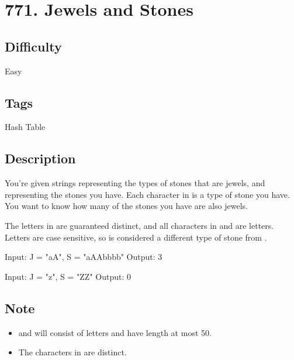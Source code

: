 \tocless\section{771. Jewels and Stones}
\label{algo:771}

\subsection*{Difficulty}
Easy

\subsection*{Tags}
Hash Table

\subsection*{Description}
You're given strings  representing the types of stones that are jewels, and  representing the stones you have. Each character in  is a type of stone you have. You want to know how many of the stones you have are also jewels.

The letters in  are guaranteed distinct, and all characters in  and  are letters. Letters are case sensitive, so  is considered a different type of stone from .

\begin{example}
\begin{multilinecode}
Input: J = "aA", S = "aAAbbbb"
Output: 3
\end{multilinecode}
\end{example}

\begin{example}
\begin{multilinecode}
Input: J = "z", S = "ZZ"
Output: 0
\end{multilinecode}
\end{example}

\subsection*{Note}
\begin{itemize}
    \item {} and  will consist of letters and have length at most 50.
    \item The characters in  are distinct.
\end{itemize}

